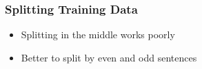     \subsubsection{Splitting Training Data}

      \begin{itemize}
        \item Splitting in the middle works poorly
        \item Better to split by even and odd sentences
      \end{itemize}